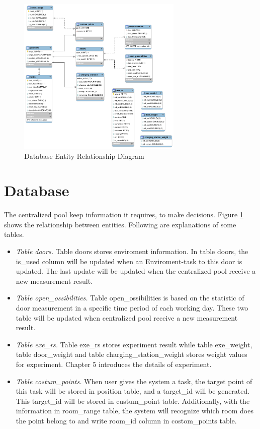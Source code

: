 \begin{figure}[htbp]
    \centering
    \includegraphics[width = 0.7\textwidth]{content/images/ch4/database_er.png}
    \caption{Database Entity Relationship Diagram}
    \label{fig:database_er}
\end{figure}


\section{Database}
The centralized pool keep information it requires, to make decisions. Figure \ref{fig:database_er} shows the relationship between entities. Following are explanations of some tables.
\begin{itemize}
	\item \textsl{Table doors.} Table doors stores enviroment information. In table doors, the is\_used column will be updated when an Enviroment-task to this door is updated. The last update will be updated when the centralized pool receive a new measurement result. 
	\item \textsl{Table open\_ossibilities.} Table open\_ossibilities is based on the statistic of door measurement in a specific time period of each working day. These two table will be updated when centralized pool receive a new measurement result. 
	\item \textsl{Table exe\_rs.} Table exe\_rs stores experiment result while table exe\_weight, table door\_weight and table charging\_station\_weight stores weight values for experiment. Chapter 5 introduces the details of experiment.
	\item \textsl{Table costum\_points.} When user gives the system a task, the target point of this task will be stored in position table, and a target\_id will be generated.  This target\_id will be stored in custum\_point table. 	Additionally, with the information in room\_range table, the system will recognize which room does the point belong to and write room\_id column in costom\_points table.
\end{itemize}


